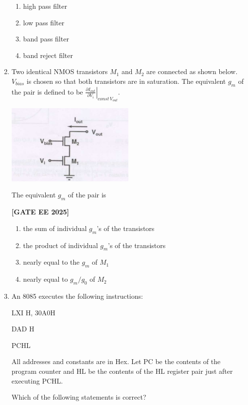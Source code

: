 \documentclass[12pt]{article}
\begin{document}
\begin{enumerate}[leftmargin=*, label=\textbf{Q.\arabic*:}]
\begin{enumerate}[label=(\Alph*)]
  \item high pass filter
  \item low pass filter
  \item band pass filter
  \item band reject filter
\end{enumerate}

\item Two identical NMOS transistors $M_1$ and $M_2$ are connected as shown below. $V_{bias}$ is chosen so that both transistors are in saturation. The equivalent $g_m$ of the pair is defined to be $\left. \frac{\partial I_{out}}{\partial V_i} \right|_{const\, V_{out}}$.

\begin{center}
\includegraphics[width=0.5\textwidth]{figs/q48.png}
\end{center}

The equivalent $g_m$ of the pair is
 
\noindent \textbf{[GATE EE 2025]}
\begin{enumerate}[label=(\Alph*)]
  \item the sum of individual $g_m$'s of the transistors
  \item the product of individual $g_m$'s of the transistors
  \item nearly equal to the $g_m$ of $M_1$
  \item nearly equal to $g_m/g_{0}$ of $M_2$
\end{enumerate}

\item An 8085 executes the following instructions:

LXI H, 30A0H

DAD H

PCHL

All addresses and constants are in Hex. Let PC be the contents of the program counter and HL be the contents of the HL register pair just after executing PCHL.

Which of the following statements is correct?
 

\end{enumerate}
\end{document}

